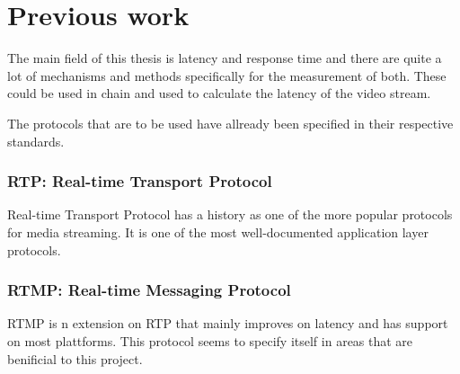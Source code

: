 \documentclass[a4paper]{article}
\begin{document}



\section{Previous work}


The main field of this thesis is latency and response time and there are quite a
lot of mechanisms and methods specifically for the measurement of both. These
could be used in chain and used to calculate the latency of the video stream.

The protocols that are to be used have allready been specified in their
respective standards.

\subsubsection*{RTP: Real-time Transport Protocol}	
Real-time Transport Protocol has a history as one of the more popular protocols
for media streaming. It is one of the most well-documented application layer
protocols. \cite{spec_RTP}

\subsubsection*{RTMP: Real-time Messaging Protocol}
RTMP is n extension on RTP that mainly improves on latency and has support on
most plattforms. This protocol seems to specify itself in areas that are
benificial to this project. \cite{spec_RTMP}
\end{document}
